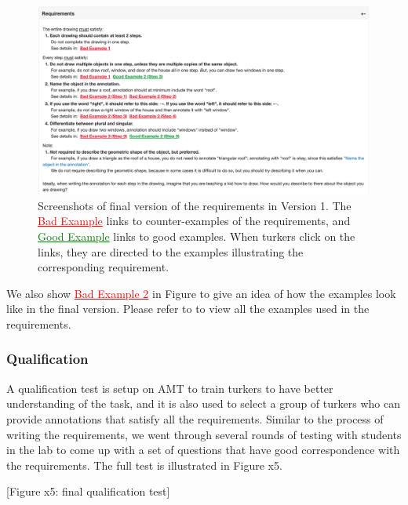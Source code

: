 \begin{figure}[!htb]
\includegraphics[width=\linewidth]{data_collection/v1_requirement.png}  
\caption{Screenshots of final version of the requirements in Version 1. The \textcolor{red}{\underline{Bad Example}} links to counter-examples of the requirements, and \textcolor{green}{\underline{Good Example}} links to good examples. When turkers click on the links, they are directed to the examples illustrating the corresponding requirement.}
\label{v1.requirement}
\end{figure}

We also show \textcolor{red}{\underline{Bad Example 2}} in Figure to give an idea of how the examples look like in the final version. Please refer to to view all the examples used in the requirements. 


\subsubsection{Qualification}
A qualification test is setup on AMT to train turkers to have better understanding of the task, and it is also used to select a group of turkers who can provide annotations that satisfy all the requirements. Similar to the process of writing the requirements, we went through several rounds of testing with students in the lab to come up with a set of questions that have good correspondence with the requirements. The full test is illustrated in Figure x5.

[Figure x5: final qualification test]


